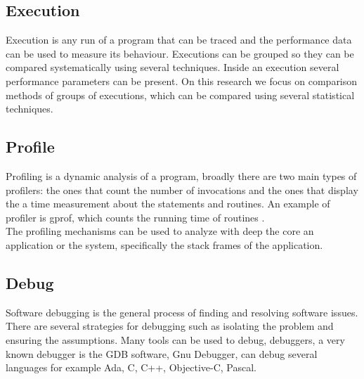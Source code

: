 \subsection{Execution}
        
Execution is any run of a program that can be traced and the performance data can be used to measure its behaviour. Executions can be grouped so they can be compared systematically using several techniques. Inside an execution several performance parameters can be present. On this research we focus on comparison methods of groups of executions, which can be compared using several statistical techniques. 

\subsection{Profile}
Profiling is a dynamic analysis of a program, broadly there are two main types of profilers: the ones that count the number of invocations and the ones that display the a time measurement about the statements and routines. An example of profiler is gprof, which counts the running time of routines \cite{Graham82gprofa}.\\
The profiling mechanisms can be used to analyze with deep the core an application or the system, specifically the stack frames of the application.

\subsection{Debug}
Software debugging is the general process of finding and resolving software issues. There are several strategies for debugging such as isolating the problem and ensuring the assumptions. Many tools can be used to debug, debuggers, a very known debugger is the GDB software, Gnu Debugger, can debug several languages for example Ada, C, C++, Objective-C, Pascal.\\

